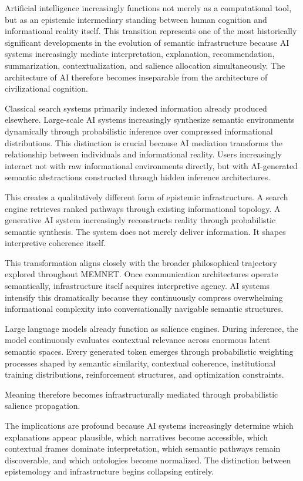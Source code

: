 \documentclass[11pt,a4paper]{article}
\begin{document}
Artificial intelligence increasingly functions not merely as a computational tool, but as an epistemic intermediary standing between human cognition and informational reality itself. This transition represents one of the most historically significant developments in the evolution of semantic infrastructure because AI systems increasingly mediate interpretation, explanation, recommendation, summarization, contextualization, and salience allocation simultaneously. The architecture of AI therefore becomes inseparable from the architecture of civilizational cognition.

Classical search systems primarily indexed information already produced elsewhere. Large-scale AI systems increasingly synthesize semantic environments dynamically through probabilistic inference over compressed informational distributions. This distinction is crucial because AI mediation transforms the relationship between individuals and informational reality. Users increasingly interact not with raw informational environments directly, but with AI-generated semantic abstractions constructed through hidden inference architectures.

This creates a qualitatively different form of epistemic infrastructure. A search engine retrieves ranked pathways through existing informational topology. A generative AI system increasingly reconstructs reality through probabilistic semantic synthesis. The system does not merely deliver information. It shapes interpretive coherence itself.

This transformation aligns closely with the broader philosophical trajectory explored throughout MEMNET. Once communication architectures operate semantically, infrastructure itself acquires interpretive agency. AI systems intensify this dramatically because they continuously compress overwhelming informational complexity into conversationally navigable semantic structures.

Large language models already function as salience engines. During inference, the model continuously evaluates contextual relevance across enormous latent semantic spaces. Every generated token emerges through probabilistic weighting processes shaped by semantic similarity, contextual coherence, institutional training distributions, reinforcement structures, and optimization constraints.

Meaning therefore becomes infrastructurally mediated through probabilistic salience propagation.

The implications are profound because AI systems increasingly determine which explanations appear plausible, which narratives become accessible, which contextual frames dominate interpretation, which semantic pathways remain discoverable, and which ontologies become normalized. The distinction between epistemology and infrastructure begins collapsing entirely.
\end{document}
